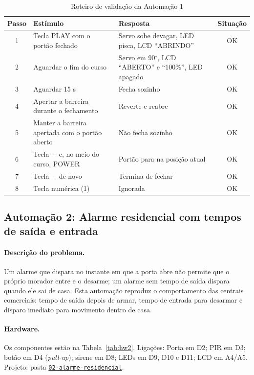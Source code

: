 \documentclass[12pt]{article}
\newcommand{\repositorio}{https://github.com/M-Beserra/Trabalho-sistemas-embarcadosA2}
\newcommand{\pasta}[1]{\href{\repositorio/tree/main/#1}{\texttt{#1}}}
\begin{document}
\begin{table}[ht]
\centering
\caption{Roteiro de validação da Automação 1}\label{tab:val1}
\footnotesize
\begin{tabularx}{\textwidth}{cXXc}
\toprule
Passo & Estímulo & Resposta & Situação \\
\midrule
1 & Tecla PLAY com o portão fechado & Servo sobe devagar, LED pisca, LCD ``ABRINDO'' & OK \\
2 & Aguardar o fim do curso & Servo em 90$^\circ$, LCD ``ABERTO'' e ``100\%'', LED apagado & OK \\
3 & Aguardar 15 s & Fecha sozinho & OK \\
4 & Apertar a barreira durante o fechamento & Reverte e reabre & OK \\
5 & Manter a barreira apertada com o portão aberto & Não fecha sozinho & OK \\
6 & Tecla $-$ e, no meio do curso, POWER & Portão para na posição atual & OK \\
7 & Tecla $-$ de novo & Termina de fechar & OK \\
8 & Tecla numérica (1) & Ignorada & OK \\
\bottomrule
\end{tabularx}
\end{table}

\subsection{Automação 2: Alarme residencial com tempos de saída e entrada}\label{sub:a2}

\paragraph{Descrição do problema.} Um alarme que dispara no instante em que a porta abre não permite que o próprio morador entre e o desarme; um alarme sem tempo de saída dispara quando ele sai de casa. Esta automação reproduz o comportamento das centrais comerciais: tempo de saída depois de armar, tempo de entrada para desarmar e disparo imediato para movimento dentro de casa.

\paragraph{Hardware.} Os componentes estão na Tabela~\ref{tab:hw2}. Ligações: Porta em D2; PIR em D3; botão em D4 (\emph{pull-up}); sirene em D8; LEDs em D9, D10 e D11; LCD em A4/A5. Projeto: pasta \pasta{02-alarme-residencial}.
\end{document}
